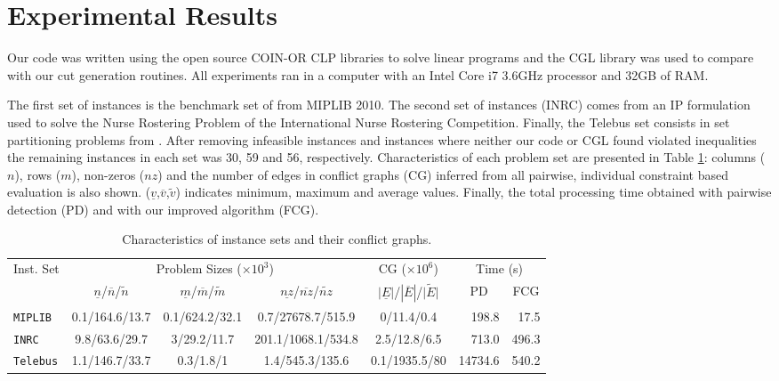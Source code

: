 \documentclass{endm}
\begin{document}
\begin{figure}
\begin{center}
\label{figOH}
\end{center}
\end{figure}

\section{Experimental Results}\label{experiments}

Our code was written using the open source COIN-OR CLP libraries to solve linear programs and the CGL library was used to compare with our cut generation routines. All experiments ran in a computer with an Intel Core i7 3.6GHz processor and 32GB of RAM.

The first set of instances is the benchmark set of from MIPLIB 2010\cite{miplib}. The second set of instances (INRC) comes from an IP formulation  used to solve the Nurse Rostering Problem  \cite{Santos2014} of the International Nurse Rostering Competition. Finally, the Telebus set consists in set partitioning problems from \cite{Borndorfer1998}. After removing infeasible instances and instances where neither our code or CGL found violated inequalities the remaining instances in each set was 30, 59 and 56, respectively. Characteristics of each problem set are presented in Table \ref{tab:inst}: columns ($n$), rows ($m$), non-zeros ($nz$) and the number of edges in conflict graphs (CG) inferred from all pairwise, individual constraint based evaluation is also shown. ($\underline{v}$,$\overline{v}$,$\tilde{v}$) indicates minimum, maximum and average values. Finally, the total processing time obtained with pairwise detection (PD) and with our improved algorithm (FCG). 

\begin{table}[h]
\scriptsize
\caption{Characteristics of instance sets and their conflict graphs.}\label{tab:inst}
\begin{center}
\begin{tabular}{|l|c|c|c|c|r|r|}
\hline 
\multirow{2}{0.8cm}{Inst. Set} & \multicolumn{3}{c|}{{Problem Sizes ($\times10^{3}$)}} & {CG ($\times10^{6}$)} & \multicolumn{2}{c|}{{Time (s)}}\tabularnewline
\cline{2-7} 
 & {$\underline{n}$/$\overline{n}$/$\tilde{n}$} & {$\underline{m}$/$\overline{m}$/$\tilde{m}$} & {$\underline{nz}$/$\overline{nz}$/$\tilde{nz}$} & {$|\underline{E}|$/$|\overline{E}|$/$\tilde{|E|}$} & \multicolumn{1}{c|}{PD} & \multicolumn{1}{c|}{FCG}\tabularnewline
\hline 
\hline 
\texttt{MIPLIB} & {0.1/164.6/13.7} & {0.1/624.2/32.1} & {0.7/27678.7/515.9} & {0/11.4/0.4} & {198.8} & {17.5}\tabularnewline
\hline 
\texttt{INRC} & {9.8/63.6/29.7} & {3/29.2/11.7} & {201.1/1068.1/534.8} & {2.5/12.8/6.5} & {713.0} & {496.3}\tabularnewline
\hline 
\texttt{Telebus} & {1.1/146.7/33.7} & {0.3/1.8/1} & {1.4/545.3/135.6} & {0.1/1935.5/80} & {14734.6} & {540.2}\tabularnewline
\hline 
\end{tabular}
\end{center}
\end{table}
\end{document}
